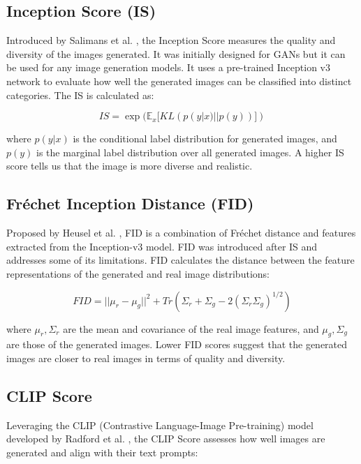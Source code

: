 \documentclass{article}
\begin{document}
\subsection{Inception Score (IS)}

Introduced by Salimans et al. \cite{salimans2016improved}, the Inception Score measures the quality and diversity of the images generated.
It was initially designed for GANs but it can be used for any image generation models. It uses a pre-trained Inception v3 network to 
evaluate how well the generated images can be classified into distinct categories. The IS is calculated as:

\begin{equation}
    IS = \exp(\mathbb{E}_x[KL(p(y|x) || p(y))])
\end{equation}

where $p(y|x)$ is the conditional label distribution for generated images, and $p(y)$ is the marginal label distribution over all generated images.
A higher IS score tells us that the image is more diverse and realistic.


\subsection{Fréchet Inception Distance (FID)}

Proposed by Heusel et al. \cite{heusel2017gans}, FID is a combination of Fréchet distance and features extracted from the 
Inception-v3 model. FID was introduced after IS and addresses some of its limitations.
FID calculates the distance between the feature representations of the generated and real image distributions:

\begin{equation}
    FID = ||\mu_r - \mu_g||^2 + Tr(\Sigma_r + \Sigma_g - 2(\Sigma_r \Sigma_g)^{1/2})
\end{equation}

where $\mu_r, \Sigma_r$ are the mean and covariance of the real image features, and $\mu_g, \Sigma_g$ are those of the generated images.
 Lower FID scores suggest that the generated images are closer to real images in terms of quality and diversity.

\subsection{CLIP Score}

Leveraging the CLIP (Contrastive Language-Image Pre-training) model developed by Radford et al. \cite{radford2021learning}, 
the CLIP Score assesses how well images are generated and align with their text prompts:
\end{document}
